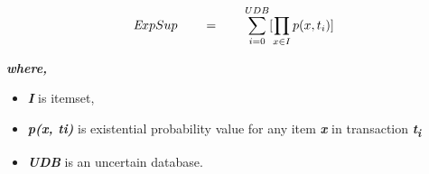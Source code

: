 %
\begin{equation}\label{equation:exp_sup}
\emph ExpSup \qquad = \qquad \sum_{i = 0}^{UDB} [\prod_{x \in I } p(x , t_i)]
\end{equation}
\begin{center}


\textbf{\emph {where,}}\\ 
\begin{itemize}
\item
\textbf{\emph {I}} is itemset,
\item
\textbf{\emph { p(x, ti)}} is existential probability value for any item \textbf{\emph {x}} in transaction \textbf{\emph {t\textsubscript{i}}} 
\item
\textbf{\emph {UDB}} is an uncertain database.

\end{itemize}
\end{center}
%
%